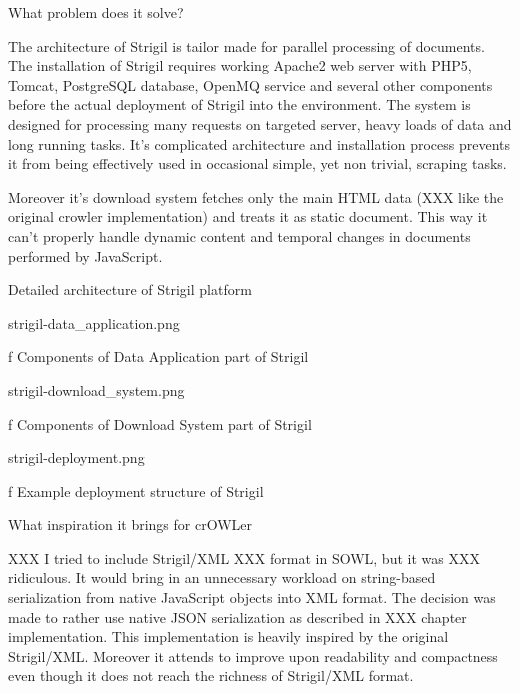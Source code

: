\secc What problem does it solve?

The architecture of Strigil is tailor made for parallel processing of
documents. The installation of Strigil requires working Apache2 web server with
PHP5, Tomcat, PostgreSQL database, OpenMQ service and several other components
before the actual deployment of Strigil into the environment. The system is
designed for processing many requests on targeted server, heavy loads of data
and long running tasks. It's complicated architecture and installation process
prevents it from being effectively used in occasional simple, yet non trivial,
scraping tasks. 

Moreover it's download system fetches only the main HTML data (XXX like the
original crowler implementation) and treats it as static document. This way it
can't properly handle dynamic content and temporal changes in documents
performed by JavaScript. 


\secc Detailed architecture of Strigil platform

\midinsert {}
\picw=10cm \cinspic strigil-data_application.png
\caption/f Components of Data Application part of Strigil 
\endinsert

\midinsert {}
\picw=10cm \cinspic strigil-download_system.png
\caption/f Components of Download System part of Strigil 
\endinsert

\midinsert {}
\picw=10cm \cinspic strigil-deployment.png
\caption/f Example deployment structure of Strigil 
\endinsert


\secc What inspiration it brings for crOWLer

XXX I tried to include Strigil/XML XXX format in SOWL, but it was XXX
ridiculous. It would bring in an unnecessary workload on string-based
serialization from native JavaScript objects into XML format. The decision was
made to rather use native JSON serialization as described in XXX chapter
implementation. This implementation is heavily inspired by the original
Strigil/XML. Moreover it attends to improve upon readability and compactness
even though it does not reach the richness of Strigil/XML format. 

%



